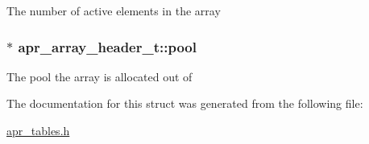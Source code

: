 The number of active elements in the array \hypertarget{structapr__array__header__t_a68f353ce65943172fcc9494aa9f6e424}{
\subsubsection[{pool}]{$\ast$ apr\-\_\-array\-\_\-header\-\_\-t\-::pool}}\label{structapr__array__header__t_a68f353ce65943172fcc9494aa9f6e424}
The pool the array is allocated out of 

The documentation for this struct was generated from the following file\-:\begin{DoxyCompactItemize}
\item 
\hyperlink{apr__tables_8h}{apr\-\_\-tables.\-h}\end{DoxyCompactItemize}
